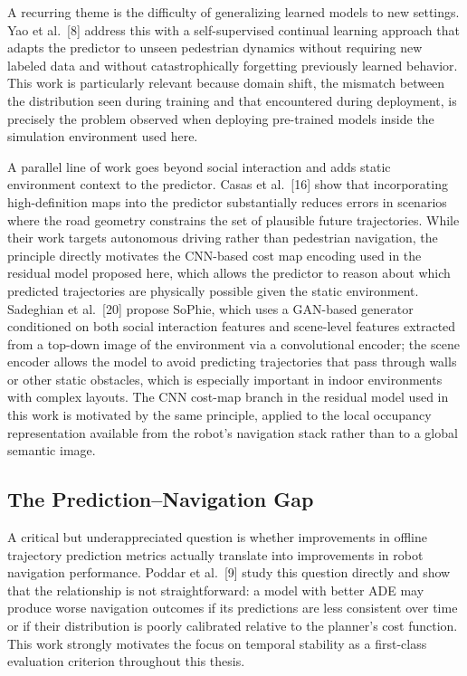 \documentclass[12pt, a4paper]{article}
\begin{document}
A recurring theme is the difficulty of generalizing learned models to new settings. Yao et al.~[8] address this with a self-supervised continual learning approach that adapts the predictor to unseen pedestrian dynamics without requiring new labeled data and without catastrophically forgetting previously learned behavior. This work is particularly relevant because domain shift, the mismatch between the distribution seen during training and that encountered during deployment, is precisely the problem observed when deploying pre-trained models inside the simulation environment used here.

A parallel line of work goes beyond social interaction and adds static environment context to the predictor. Casas et al.~[16] show that incorporating high-definition maps into the predictor substantially reduces errors in scenarios where the road geometry constrains the set of plausible future trajectories. While their work targets autonomous driving rather than pedestrian navigation, the principle directly motivates the CNN-based cost map encoding used in the residual model proposed here, which allows the predictor to reason about which predicted trajectories are physically possible given the static environment. Sadeghian et al.~[20] propose SoPhie, which uses a GAN-based generator conditioned on both social interaction features and scene-level features extracted from a top-down image of the environment via a convolutional encoder; the scene encoder allows the model to avoid predicting trajectories that pass through walls or other static obstacles, which is especially important in indoor environments with complex layouts. The CNN cost-map branch in the residual model used in this work is motivated by the same principle, applied to the local occupancy representation available from the robot's navigation stack rather than to a global semantic image.

\subsection{The Prediction--Navigation Gap}

A critical but underappreciated question is whether improvements in offline trajectory prediction metrics actually translate into improvements in robot navigation performance. Poddar et al.~[9] study this question directly and show that the relationship is not straightforward: a model with better ADE may produce worse navigation outcomes if its predictions are less consistent over time or if their distribution is poorly calibrated relative to the planner's cost function. This work strongly motivates the focus on temporal stability as a first-class evaluation criterion throughout this thesis.
\end{document}
